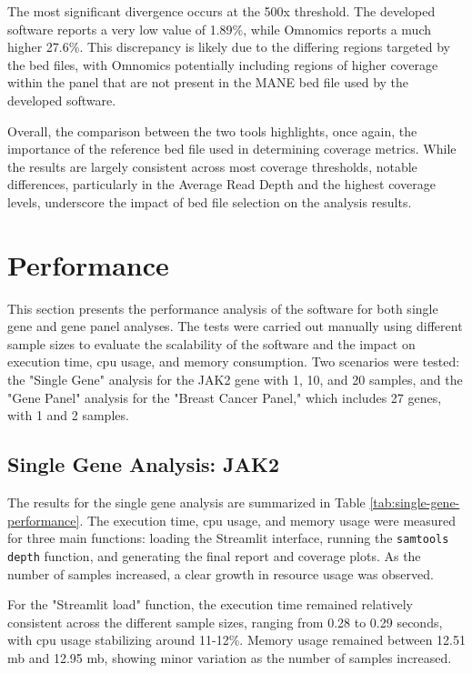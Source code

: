     The most significant divergence occurs at the 500x threshold. The developed software reports a very low value of 1.89\%, while Omnomics reports a much higher 27.6\%. This discrepancy is likely due to the differing regions targeted by the \ac{bed} files, with Omnomics potentially including regions of higher coverage within the panel that are not present in the MANE \ac{bed} file used by the developed software.
    
    Overall, the comparison between the two tools highlights, once again, the importance of the reference \ac{bed} file used in determining coverage metrics. While the results are largely consistent across most coverage thresholds, notable differences, particularly in the Average Read Depth and the highest coverage levels, underscore the impact of \ac{bed} file selection on the analysis results.
    

\section{Performance}

This section presents the performance analysis of the software for both single gene and gene panel analyses. The tests were carried out manually using different sample sizes to evaluate the scalability of the software and the impact on execution time, \ac{cpu} usage, and memory consumption. Two scenarios were tested: the "Single Gene" analysis for the JAK2 gene with 1, 10, and 20 samples, and the "Gene Panel" analysis for the "Breast Cancer Panel," which includes 27 genes, with 1 and 2 samples.

\subsection{Single Gene Analysis: JAK2}

The results for the single gene analysis are summarized in Table \ref{tab:single-gene-performance}. The execution time, \ac{cpu} usage, and memory usage were measured for three main functions: loading the Streamlit interface, running the \texttt{samtools depth} function, and generating the final report and coverage plots. As the number of samples increased, a clear growth in resource usage was observed.

For the "Streamlit load" function, the execution time remained relatively consistent across the different sample sizes, ranging from 0.28 to 0.29 seconds, with \ac{cpu} usage stabilizing around 11-12\%. Memory usage remained between 12.51 \ac{mb} and 12.95 \ac{mb}, showing minor variation as the number of samples increased.

